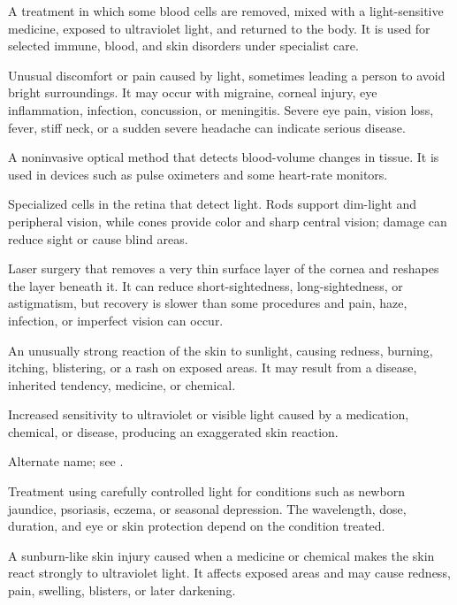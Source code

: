  A treatment in which some blood cells are removed, mixed with a light-sensitive medicine, exposed to ultraviolet light, and returned to the body. It is used for selected immune, blood, and skin disorders under specialist care.

 Unusual discomfort or pain caused by light, sometimes leading a person to avoid bright surroundings. It may occur with migraine, corneal injury, eye inflammation, infection, concussion, or meningitis. Severe eye pain, vision loss, fever, stiff neck, or a sudden severe headache can indicate serious disease.

 A noninvasive optical method that detects blood-volume changes in tissue. It is used in devices such as pulse oximeters and some heart-rate monitors.

 Specialized cells in the retina that detect light. Rods support dim-light and peripheral vision, while cones provide color and sharp central vision; damage can reduce sight or cause blind areas.

 Laser surgery that removes a very thin surface layer of the cornea and reshapes the layer beneath it. It can reduce short-sightedness, long-sightedness, or astigmatism, but recovery is slower than some procedures and pain, haze, infection, or imperfect vision can occur.

 An unusually strong reaction of the skin to sunlight, causing redness, burning, itching, blistering, or a rash on exposed areas. It may result from a disease, inherited tendency, medicine, or chemical.

 Increased sensitivity to ultraviolet or visible light caused by a medication, chemical, or disease, producing an exaggerated skin reaction.

 Alternate name; see .

 Treatment using carefully controlled light for conditions such as newborn jaundice, psoriasis, eczema, or seasonal depression. The wavelength, dose, duration, and eye or skin protection depend on the condition treated.

 A sunburn-like skin injury caused when a medicine or chemical makes the skin react strongly to ultraviolet light. It affects exposed areas and may cause redness, pain, swelling, blisters, or later darkening.

